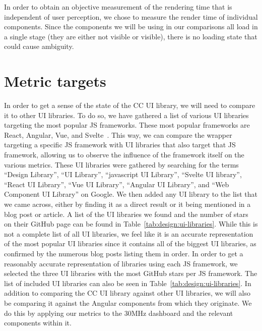 In order to obtain an objective measurement of the rendering time that is independent of user perception, we chose to measure the render time of individual components. Since the components we will be using in our comparisons all load in a single stage (they are either not visible or visible), there is no loading state that could cause ambiguity.

\section{Metric targets}
In order to get a sense of the state of the CC UI library, we will need to compare it to other UI libraries. To do so, we have gathered a list of various UI libraries targeting the most popular JS frameworks. These most popular frameworks are React, Angular, Vue, and Svelte~. This way, we can compare the wrapper targeting a specific JS framework with UI libraries that also target that JS framework, allowing us to observe the influence of the framework itself on the various metrics. These UI libraries were gathered by searching for the terms ``Design Library'', ``UI Library'', ``javascript UI Library'', ``Svelte UI library'', ``React UI Library'', ``Vue UI Library'', ``Angular UI Library'', and ``Web Component UI Library'' on Google. We then added any UI library to the list that we came across, either by finding it as a direct result or it being mentioned in a blog post or article. A list of the UI libraries we found and the number of stars on their GitHub page can be found in Table~\ref{tab:design:ui-libraries}. While this is not a complete list of all UI libraries, we feel like it is an accurate representation of the most popular UI libraries since it contains all of the biggest UI libraries, as confirmed by the numerous blog posts listing them in order. In order to get a reasonably accurate representation of libraries using each JS framework, we selected the three UI libraries with the most GitHub stars per JS framework. The list of included UI libraries can also be seen in Table~\ref{tab:design:ui-libraries}. In addition to comparing the CC UI library against other UI libraries, we will also be comparing it against the Angular components from which they originate. We do this by applying our metrics to the 30MHz dashboard and the relevant components within it.

